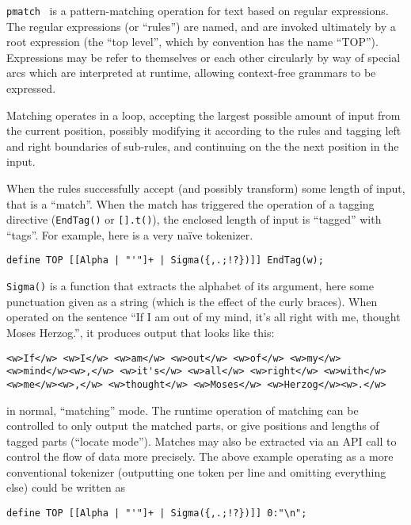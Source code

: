 \documentclass{llncs}
\begin{document}
\verb+pmatch+~\cite{pmatch} is a pattern-matching operation for text based on
regular expressions. The regular expressions (or ``rules'') are named, and are
invoked ultimately by a root expression (the ``top level'', which by convention
has the name ``TOP''). Expressions may be refer to themselves or each other
circularly by way of special arcs which are interpreted at runtime, allowing
context-free grammars to be expressed.

Matching operates in a loop, accepting the largest
possible amount of input from the current position, possibly modifying it
according to the rules and tagging left and right boundaries of sub-rules, and
continuing on the the next position in the input.

When the rules successfully accept (and possibly transform) some length of
input, that is a ``match''.
When the match has triggered the operation of a tagging directive
(\verb+EndTag()+ or \verb+[].t()+), the enclosed length of input is ``tagged'' with
``tags''. For example, here is a very naïve tokenizer.

\begin{verbatim}
define TOP [[Alpha | "'"]+ | Sigma({,.;!?})]] EndTag(w);
\end{verbatim}

\verb+Sigma()+ is a function that extracts the alphabet of its argument, here
some punctuation given as a string (which is the effect of the curly braces).
When operated on the sentence
``If I am out of my mind, it's all right with me, thought Moses Herzog.'',
it produces output that looks like this:

\begin{verbatim}
<w>If</w> <w>I</w> <w>am</w> <w>out</w> <w>of</w> <w>my</w>
<w>mind</w><w>,</w> <w>it's</w> <w>all</w> <w>right</w> <w>with</w>
<w>me</w><w>,</w> <w>thought</w> <w>Moses</w> <w>Herzog</w><w>.</w>
\end{verbatim}

in normal, ``matching'' mode. The runtime operation of matching can be
controlled to only output the matched parts, or give positions and
lengths of tagged parts (``locate mode''). Matches may also be extracted
via an API call to control the flow of data more precisely. The above example
operating as a more conventional tokenizer (outputting one token per line and
omitting everything else) could be written as

\begin{verbatim}
define TOP [[Alpha | "'"]+ | Sigma({,.;!?})]] 0:"\n";
\end{verbatim}
\end{document}
